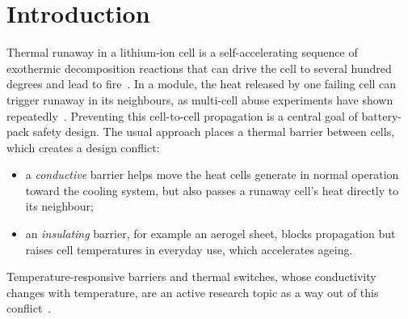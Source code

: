 \documentclass[11pt]{article}
\begin{document}
\begin{abstract}
placeholders, so the conclusions are qualitative. Finally, 452 filled-silicone formulations
(particles, silver nanowires, nanoparticle--nanowire hybrids, endothermic fillers and
expandable microspheres) are screened with an effective-medium model extended for
fin-limited nanowires, percolating wire networks and microsphere expansion, and
checked against measured nanowire composites. Static formulations need at least
5.6\,mm to contain runaway, and 8.5\,mm or more to keep the normal-use peak near
44\,$^\circ$C. The recommended
formulation is silicone with 40\,vol\% expandable microspheres and 20\,vol\% Al(OH)$_3$,
which contains runaway at 2.9\,mm (3.5\,mm in the worst case tested) at a 42\,$^\circ$C
normal-use peak. Conductive nanowire networks raise cold-state conductivity but are
counterproductive unless the expansion breaks them.
\end{abstract}

\section{Introduction}

Thermal runaway in a lithium-ion cell is a self-accelerating sequence of exothermic
decomposition reactions that can drive the cell to several hundred degrees and lead to
fire~\cite{feng2018review,wang2012fire,bandhauer2011}. In a module, the heat released by
one failing cell can trigger runaway in its neighbours, as multi-cell abuse experiments
have shown repeatedly~\cite{lamb2015,lopez2015propagation}. Preventing this cell-to-cell
propagation is a central goal of battery-pack safety design. The usual approach places a
thermal barrier between cells, which creates a design conflict:
\begin{itemize}
  \item a \emph{conductive} barrier helps move the heat cells generate in normal
        operation toward the cooling system, but also passes a runaway cell's heat
        directly to its neighbour;
  \item an \emph{insulating} barrier, for example an aerogel sheet, blocks propagation
        but raises cell temperatures in everyday use, which accelerates ageing.
\end{itemize}
Temperature-responsive barriers and thermal switches, whose conductivity changes with
temperature, are an active research topic as a way out of this
conflict~\cite{wang2024regulator,li2025switches}.
\end{document}
